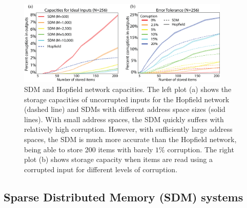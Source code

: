 \documentclass[10pt,letterpaper]{article}
\begin{document}
\begin{figure}[t!]
  \begin{center}
    \includegraphics[width=0.9\textwidth]{./figures/all-capacities.png}
    \caption{SDM and Hopfield network capacities. The left plot (a)
      shows the storage capacities of uncorrupted inputs for the
      Hopfield network (dashed line) and SDMs with different address
      space sizes (solid lines). With small address spaces, the SDM
      quickly suffers with relatively high corruption. However, with
      sufficiently large address spaces, the SDM is much more accurate
      than the Hopfield network, being able to store 200 items with
      barely $1\%$ corruption. The right plot (b) shows storage
      capacity when items are read using a corrupted input for
      different levels of corruption.}
    \label{fig:capacity}
  \end{center}
\end{figure}


\subsection{Sparse Distributed Memory (SDM) systems}
\end{document}
